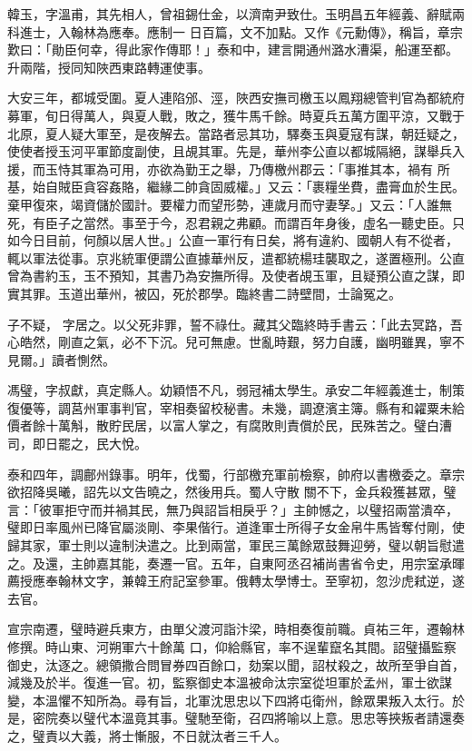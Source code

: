 \begin{pinyinscope}
 韓玉，字溫甫，其先相人，曾祖錫仕金，以濟南尹致仕。玉明昌五年經義、辭賦兩科進士，入翰林為應奉。應制一
 日百篇，文不加點。又作《元勳傳》，稱旨，章宗歎曰：「勛臣何幸，得此家作傳耶！」泰和中，建言開通州潞水漕渠，船運至都。升兩階，授同知陜西東路轉運使事。



 大安三年，都城受圍。夏人連陷邠、涇，陜西安撫司檄玉以鳳翔總管判官為都統府募軍，旬日得萬人，與夏人戰，敗之，獲牛馬千餘。時夏兵五萬方圍平涼，又戰于北原，夏人疑大軍至，是夜解去。當路者忌其功，驛奏玉與夏寇有謀，朝廷疑之，使使者授玉河平軍節度副使，且覘其軍。先是，華州李公直以都城隔絕，謀舉兵入援，而玉恃其軍為可用，亦欲為勤王之舉，乃傳檄州郡云：「事推其本，禍有
 所基，始自賊臣貪容姦賂，繼緣二帥貪固威權。」又云：「裹糧坐費，盡膏血於生民。棄甲復來，竭資儲於國計。要權力而望形勢，連歲月而守妻孥。」又云：「人誰無死，有臣子之當然。事至于今，忍君親之弗顧。而謂百年身後，虛名一聽史臣。只如今日目前，何顏以居人世。」公直一軍行有日矣，將有違約、國朝人有不從者，輒以軍法從事。京兆統軍便謂公直據華州反，遣都統楊珪襲取之，遂置極刑。公直曾為書約玉，玉不預知，其書乃為安撫所得。及使者覘玉軍，且疑預公直之謀，即實其罪。玉道出華州，被囚，死於郡學。臨終書二詩壁間，士論冤之。



 子不疑，
 字居之。以父死非罪，誓不祿仕。藏其父臨終時手書云：「此去冥路，吾心皓然，剛直之氣，必不下沉。兒可無慮。世亂時艱，努力自護，幽明雖異，寧不見爾。」讀者惻然。



 馮璧，字叔獻，真定縣人。幼穎悟不凡，弱冠補太學生。承安二年經義進士，制策復優等，調莒州軍事判官，宰相奏留校秘書。未幾，調遼濱主簿。縣有和糴粟未給價者餘十萬斛，散貯民居，以富人掌之，有腐敗則責償於民，民殊苦之。璧白漕司，即日罷之，民大悅。



 泰和四年，調鄜州錄事。明年，伐蜀，行部檄充軍前檢察，帥府以書檄委之。章宗欲招降吳曦，詔先以文告曉之，然後用兵。蜀人守散
 關不下，金兵殺獲甚眾，璧言：「彼軍拒守而并禍其民，無乃與詔旨相戾乎？」主帥憾之，以璧招兩當潰卒，璧即日率風州已降官屬淡剛、李果偕行。道逢軍士所得子女金帛牛馬皆奪付剛，使歸其家，軍士則以違制決遣之。比到兩當，軍民三萬餘眾鼓舞迎勞，璧以朝旨慰遣之。及還，主帥嘉其能，奏遷一官。五年，自東阿丞召補尚書省令史，用宗室承暉薦授應奉翰林文字，兼韓王府記室參軍。俄轉太學博士。至寧初，忽沙虎弒逆，遂去官。



 宣宗南遷，璧時避兵東方，由單父渡河詣汴梁，時相奏復前職。貞祐三年，遷翰林修撰。時山東、河朔軍六十餘萬
 口，仰給縣官，率不逞輩竄名其間。詔璧攝監察御史，汰逐之。總領撒合問冒券四百餘口，劾案以聞，詔杖殺之，故所至爭自首，減幾及於半。復進一官。初，監察御史本溫被命汰宗室從坦軍於孟州，軍士欲謀變，本溫懼不知所為。尋有旨，北軍沈思忠以下四將屯衛州，餘眾果叛入太行。於是，密院奏以璧代本溫竟其事。璧馳至衛，召四將喻以上意。思忠等挾叛者請還奏之，璧責以大義，將士慚服，不日就汰者三千人。




\end{pinyinscope}
